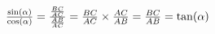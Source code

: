 
${\sin(\alpha)\over\cos(\alpha)} = 
{{BC\over AC}\over{ AB\over AC}} =
{ BC\over AC}\times{ AC\over AB} =
 { BC\over AB} = \tan(\alpha)$ 

